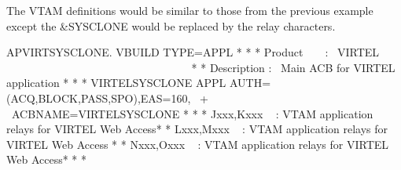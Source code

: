\documentclass[letterpaper,10pt,english]{sphinxmanual}
\begin{document}
The VTAM definitions would be similar to those from the previous example except the \&SYSCLONE would be replaced by the relay characters.

\begin{sphinxVerbatim}[commandchars=\\\{\}]
APVIRT\PYGZam{}SYSCLONE. VBUILD TYPE=APPL
* \PYGZhy{}\PYGZhy{}\PYGZhy{}\PYGZhy{}\PYGZhy{}\PYGZhy{}\PYGZhy{}\PYGZhy{}\PYGZhy{}\PYGZhy{}\PYGZhy{}\PYGZhy{}\PYGZhy{}\PYGZhy{}\PYGZhy{}\PYGZhy{}\PYGZhy{}\PYGZhy{}\PYGZhy{}\PYGZhy{}\PYGZhy{}\PYGZhy{}\PYGZhy{}\PYGZhy{}\PYGZhy{}\PYGZhy{}\PYGZhy{}\PYGZhy{}\PYGZhy{}\PYGZhy{}\PYGZhy{}\PYGZhy{}\PYGZhy{}\PYGZhy{}\PYGZhy{}\PYGZhy{}\PYGZhy{}\PYGZhy{}\PYGZhy{}\PYGZhy{}\PYGZhy{}\PYGZhy{}\PYGZhy{}\PYGZhy{}\PYGZhy{}\PYGZhy{}\PYGZhy{}\PYGZhy{}\PYGZhy{}\PYGZhy{}\PYGZhy{}\PYGZhy{}\PYGZhy{}\PYGZhy{}\PYGZhy{}\PYGZhy{}\PYGZhy{}\PYGZhy{}\PYGZhy{}\PYGZhy{}\PYGZhy{}\PYGZhy{}\PYGZhy{}\PYGZhy{}\PYGZhy{}\PYGZhy{}*
* Product     :  VIRTEL                                             *
* Description :  Main ACB for VIRTEL application                    *
* \PYGZhy{}\PYGZhy{}\PYGZhy{}\PYGZhy{}\PYGZhy{}\PYGZhy{}\PYGZhy{}\PYGZhy{}\PYGZhy{}\PYGZhy{}\PYGZhy{}\PYGZhy{}\PYGZhy{}\PYGZhy{}\PYGZhy{}\PYGZhy{}\PYGZhy{}\PYGZhy{}\PYGZhy{}\PYGZhy{}\PYGZhy{}\PYGZhy{}\PYGZhy{}\PYGZhy{}\PYGZhy{}\PYGZhy{}\PYGZhy{}\PYGZhy{}\PYGZhy{}\PYGZhy{}\PYGZhy{}\PYGZhy{}\PYGZhy{}\PYGZhy{}\PYGZhy{}\PYGZhy{}\PYGZhy{}\PYGZhy{}\PYGZhy{}\PYGZhy{}\PYGZhy{}\PYGZhy{}\PYGZhy{}\PYGZhy{}\PYGZhy{}\PYGZhy{}\PYGZhy{}\PYGZhy{}\PYGZhy{}\PYGZhy{}\PYGZhy{}\PYGZhy{}\PYGZhy{}\PYGZhy{}\PYGZhy{}\PYGZhy{}\PYGZhy{}\PYGZhy{}\PYGZhy{}\PYGZhy{}\PYGZhy{}\PYGZhy{}\PYGZhy{}\PYGZhy{}\PYGZhy{}\PYGZhy{}*
VIRTEL\PYGZam{}SYSCLONE APPL AUTH=(ACQ,BLOCK,PASS,SPO),EAS=160,               +
             ACBNAME=VIRTEL\PYGZam{}SYSCLONE
* \PYGZhy{}\PYGZhy{}\PYGZhy{}\PYGZhy{}\PYGZhy{}\PYGZhy{}\PYGZhy{}\PYGZhy{}\PYGZhy{}\PYGZhy{}\PYGZhy{}\PYGZhy{}\PYGZhy{}\PYGZhy{}\PYGZhy{}\PYGZhy{}\PYGZhy{}\PYGZhy{}\PYGZhy{}\PYGZhy{}\PYGZhy{}\PYGZhy{}\PYGZhy{}\PYGZhy{}\PYGZhy{}\PYGZhy{}\PYGZhy{}\PYGZhy{}\PYGZhy{}\PYGZhy{}\PYGZhy{}\PYGZhy{}\PYGZhy{}\PYGZhy{}\PYGZhy{}\PYGZhy{}\PYGZhy{}\PYGZhy{}\PYGZhy{}\PYGZhy{}\PYGZhy{}\PYGZhy{}\PYGZhy{}\PYGZhy{}\PYGZhy{}\PYGZhy{}\PYGZhy{}\PYGZhy{}\PYGZhy{}\PYGZhy{}\PYGZhy{}\PYGZhy{}\PYGZhy{}\PYGZhy{}\PYGZhy{}\PYGZhy{}\PYGZhy{}\PYGZhy{}\PYGZhy{}\PYGZhy{}\PYGZhy{}\PYGZhy{}\PYGZhy{}\PYGZhy{}\PYGZhy{}\PYGZhy{}*
* Jxxx,Kxxx   : VTAM application relays for VIRTEL Web Access*
* Lxxx,Mxxx   : VTAM application relays for VIRTEL Web Access *
* Nxxx,Oxxx   : VTAM application relays for VIRTEL Web Access*
* \PYGZhy{}\PYGZhy{}\PYGZhy{}\PYGZhy{}\PYGZhy{}\PYGZhy{}\PYGZhy{}\PYGZhy{}\PYGZhy{}\PYGZhy{}\PYGZhy{}\PYGZhy{}\PYGZhy{}\PYGZhy{}\PYGZhy{}\PYGZhy{}\PYGZhy{}\PYGZhy{}\PYGZhy{}\PYGZhy{}\PYGZhy{}\PYGZhy{}\PYGZhy{}\PYGZhy{}\PYGZhy{}\PYGZhy{}\PYGZhy{}\PYGZhy{}\PYGZhy{}\PYGZhy{}\PYGZhy{}\PYGZhy{}\PYGZhy{}\PYGZhy{}\PYGZhy{}\PYGZhy{}\PYGZhy{}\PYGZhy{}\PYGZhy{}\PYGZhy{}\PYGZhy{}\PYGZhy{}\PYGZhy{}\PYGZhy{}\PYGZhy{}\PYGZhy{}\PYGZhy{}\PYGZhy{}\PYGZhy{}\PYGZhy{}\PYGZhy{}\PYGZhy{}\PYGZhy{}\PYGZhy{}\PYGZhy{}\PYGZhy{}\PYGZhy{}\PYGZhy{}\PYGZhy{}\PYGZhy{}\PYGZhy{}\PYGZhy{}\PYGZhy{}\PYGZhy{}\PYGZhy{}\PYGZhy{}*

\end{sphinxVerbatim}
\end{document}
